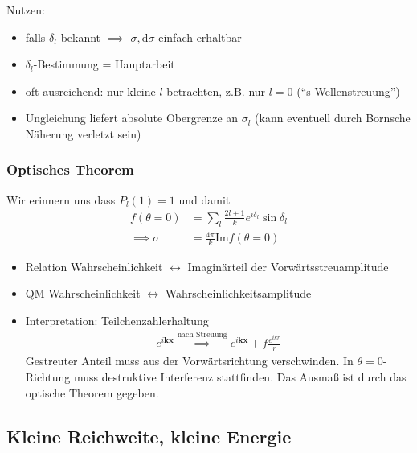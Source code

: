 \documentclass[11pt,a4paper]{report}
\begin{document}
Nutzen: 
\begin{itemize}
    \item falls $\delta_l$ bekannt $\implies$ $\sigma, \mathrm{d}\sigma$ einfach erhaltbar
    \item $\delta_l$-Bestimmung = Hauptarbeit
    \item oft ausreichend: nur kleine $l$ betrachten, z.B. nur $l=0$ (``s-Wellenstreuung'')
    \item Ungleichung liefert absolute Obergrenze an $\sigma_l$ (kann eventuell durch Bornsche Näherung verletzt sein)
\end{itemize}

\subsubsection{Optisches Theorem}

Wir erinnern uns dass $P_l(1) = 1$ und damit
\begin{align*}
    f(\theta = 0) &= \sum_l \frac{2 l + 1}{k} e^{i \delta_l} \sin \delta_l \\
    \implies \sigma &= \frac{4\pi}{k} \mathrm{Im} f(\theta = 0)
\end{align*}

\begin{itemize}
    \item Relation Wahrscheinlichkeit $\leftrightarrow$ Imaginärteil der Vorwärtsstreuamplitude
    \item QM Wahrscheinlichkeit $\leftrightarrow$ Wahrscheinlichkeitsamplitude
    \item Interpretation: Teilchenzahlerhaltung
    \begin{align*}
        e^{i \mathbf{k} \mathbf{x}} \stackrel{\text{nach Streuung}}{\implies} e^{i \mathbf{k} \mathbf{x}} + f \frac{e^{i k r}}{r}
    \end{align*}
    Gestreuter Anteil muss aus der Vorwärtsrichtung verschwinden. In $\theta=0$-Richtung muss destruktive Interferenz stattfinden.
    Das Ausmaß ist durch das optische Theorem gegeben.
\end{itemize}

\subsection{Kleine Reichweite, kleine Energie}
\end{document}
